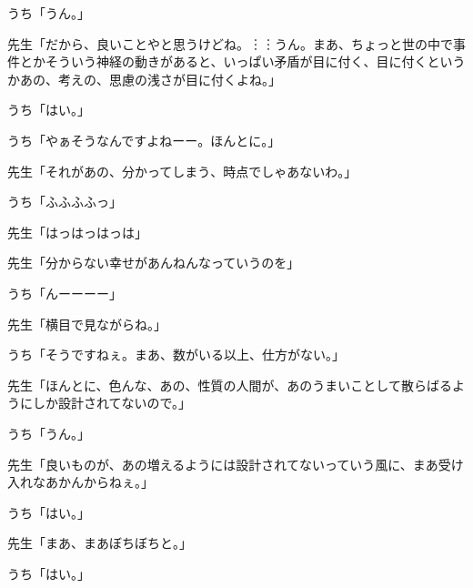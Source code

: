 \documentclass[b5j,twoside,twocolumn]{utarticle}
\begin{document}
\begin{description}
\item うち「うん。」
\item 先生「だから、良いことやと思うけどね。︙︙うん。まあ、ちょっと世の中で事件とかそういう神経の動きがあると、いっぱい矛盾が目に付く、目に付くというかあの、考えの、思慮の浅さが目に付くよね。」
\item うち「はい。」
\item うち「やぁそうなんですよねーー。ほんとに。」
\item 先生「それがあの、分かってしまう、時点でしゃあないわ。」
\item うち「ふふふふっ」
\item 先生「はっはっはっは」
\item 先生「分からない幸せがあんねんなっていうのを」
\item うち「んーーーー」
\item 先生「横目で見ながらね。」
\item うち「そうですねぇ。まあ、数がいる以上、仕方がない。」
\item 先生「ほんとに、色んな、あの、性質の人間が、あのうまいことして散らばるようにしか設計されてないので。」
\item うち「うん。」
\item 先生「良いものが、あの増えるようには設計されてないっていう風に、まあ受け入れなあかんからねぇ。」
\item うち「はい。」
\item 先生「まあ、まあぼちぼちと。」
\item うち「はい。」
\end{description}
\end{document}
